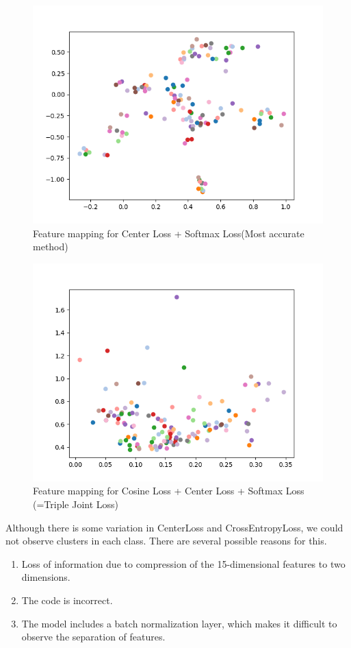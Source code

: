 \documentclass[dvipdfmx]{article}
\begin{document}
\begin{figure}[H]
\begin{center}
\includegraphics[width=0.8\linewidth]{./img/Center_300_01_Fmap.png}
\end{center}
\caption{Feature mapping for Center Loss + Softmax Loss(Most accurate method)}
\end{figure}

\begin{figure}[H]
\begin{center}
\includegraphics[width=0.8\linewidth]{./img/Cos_300_01_Fmap.png}
\end{center}
\caption{Feature mapping for Cosine Loss + Center Loss + Softmax Loss (=Triple Joint Loss)}
\end{figure}

Although there is some variation in CenterLoss and CrossEntropyLoss, we could not observe clusters in each class. There are several possible reasons for this.
\begin{enumerate}
    \item Loss of information due to compression of the 15-dimensional features to two dimensions.
    \item The code is incorrect.
    \item The model includes a batch normalization layer, which makes it difficult to observe the separation of features.
\end{enumerate}
\end{document}
